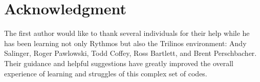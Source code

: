 
\section*{Acknowledgment}

The first author would like to thank several individuals for their
help while he has been learning not only Rythmos but also the Trilinos
environment: Andy Salinger, Roger Pawlowski, Todd Coffey, Ross Bartlett,
and Brent Perschbacher. Their guidance and helpful suggestions have
greatly improved the overall experience of learning and struggles
of this complex set of codes.

